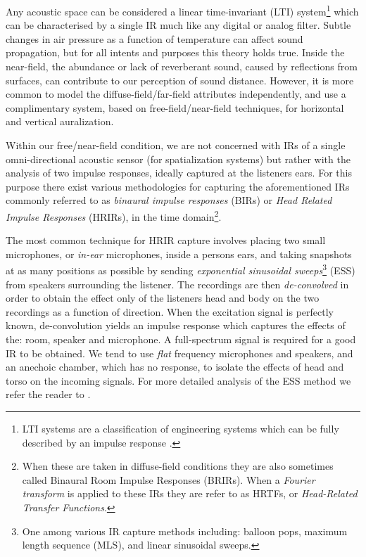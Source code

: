 Any acoustic space can be considered a linear time-invariant (LTI) system\footnote{LTI systems are a classification of engineering systems which can be fully described by an impulse response \cite{LinearTi32:online}.} which can be characterised by a single IR much like any digital or analog filter. Subtle changes in air pressure as a function of temperature can affect sound propagation, but for all intents and purposes this theory holds true. Inside the near-field, the abundance or lack of reverberant sound, caused by reflections from surfaces, can contribute to our perception of sound distance. However, it is more common to model the diffuse-field/far-field attributes independently, and use a complimentary system, based on free-field/near-field techniques, for horizontal and vertical auralization.

Within our free/near-field condition, we are not concerned with IRs of a single omni-directional acoustic sensor (for spatialization systems) but rather with the analysis of two impulse responses, ideally captured at the listeners ears. For this purpose there exist various methodologies for capturing the aforementioned IRs commonly referred to as \textit{binaural impulse responses} (BIRs) or \textit{Head Related Impulse Responses} (HRIRs), in the time domain\footnote{When these are taken in diffuse-field conditions they are also sometimes called Binaural Room Impulse Responses (BRIRs). When a \textit{Fourier transform} is applied to these IRs they are refer to as HRTFs, or \textit{Head-Related Transfer Functions}.}. 

The most common technique for HRIR capture involves placing two small microphones, or \textit{in-ear} microphones, inside a persons ears, and taking snapshots at as many positions as possible by sending \textit{exponential sinusoidal sweeps}\footnote{One among various IR capture methods including: balloon pops, maximum length sequence (MLS), and linear sinusoidal sweeps.} (ESS) from speakers surrounding the listener. The recordings are then \textit{de-convolved} in order to obtain the effect only of the listeners head and body on the two recordings as a function of direction. When the excitation signal is perfectly known, de-convolution yields an impulse response which captures the effects of the: room, speaker and microphone. A full-spectrum signal is required for a good IR to be obtained. We tend to use \textit{flat} frequency microphones and speakers, and an anechoic chamber, which has no response, to isolate the effects of head and torso on the incoming signals. For more detailed analysis of the ESS method we refer the reader to \cite{farina2007advancements}. 

